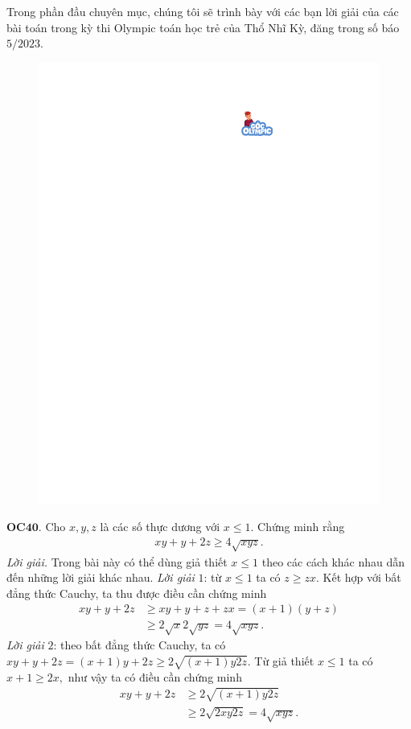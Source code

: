 \begin{multicols}{2}
	Trong phần đầu chuyên mục, chúng tôi sẽ trình bày với các bạn lời giải của các bài toán trong kỳ thi Olympic toán học trẻ của Thổ Nhĩ Kỳ, đăng trong số báo $5/2023$. 
	\begin{figure}[H]
		\vspace*{-5pt}
		\centering
		\captionsetup{labelformat= empty, justification=centering}
		\includegraphics[width= 1\linewidth]{gocolympic}
		\vspace*{-10pt}
	\end{figure}
	{\bf\color{cackithi} OC$\pmb{40.}$} Cho $x, y, z$ là các số thực dương với $x\le 1.$ Chứng minh rằng
	\begin{align*}
		xy+y+2z \geq 4 \sqrt{xyz}.
	\end{align*}
	\textit{Lời giải.} Trong bài này có thể dùng giả thiết $x\le 1$ theo các cách khác nhau dẫn đến những lời giải khác nhau.
	\vskip 0.1cm
	\textit{Lời giải} $1$: từ $x\le 1$ ta có $z \ge zx.$ Kết hợp với bất đẳng thức Cauchy, ta thu được điều cần chứng minh
	\begin{align*}
		xy+y+2z &\ge  xy \!+\!y \!+\! z \!+\! zx = (x\!+\!1)(y\!+\!z) \\
		&\ge 2\sqrt{x}2\sqrt{yz}= 4 \sqrt{xyz}.
	\end{align*}
	\textit{Lời giải} $2$: theo bất đẳng thức Cauchy, ta có $ xy+y+2z=(x+1)y+ 2z \ge 2\sqrt{(x+1)y2z}.$ Từ giả thiết $x\le 1$ ta có $x+1\ge 2x,$ như vậy ta có điều cần chứng minh
	\begin{align*}
		xy+y+2z &\ge 2\sqrt{(x+1)y2z}\\
		&\ge 2\sqrt{2xy2z}= 4\sqrt{xyz}.
	\end{align*} 
	

\end{multicols}

